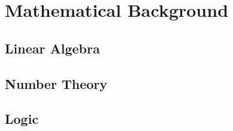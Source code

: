 \chapter{Mathematical Background}
\label{background}
\section{Linear Algebra}



\section{Number Theory}




\section{Logic}


